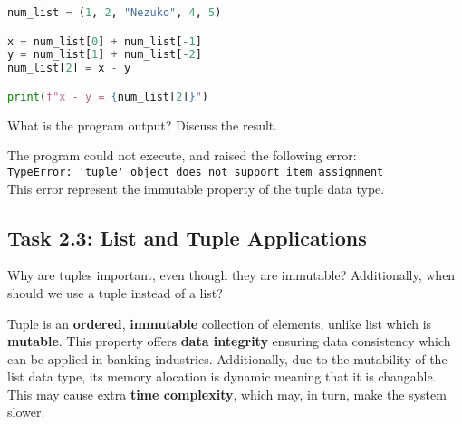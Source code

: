 \documentclass[11pt]{article}
\begin{document}
\begin{lstlisting}[language=Python]
num_list = (1, 2, "Nezuko", 4, 5)

x = num_list[0] + num_list[-1]
y = num_list[1] + num_list[-2]
num_list[2] = x - y

print(f"x - y = {num_list[2]}")
\end{lstlisting}

\noindent
What is the program output? Discuss the result.
\begin{tcolorbox}[colback=black!10!white, colframe=black!75!white, title=\textbf{Answer}]
    The program could not execute, and raised the following error:\\
    \verb|TypeError: 'tuple' object does not support item assignment|\\
    This error represent the immutable property of the tuple data type.
\end{tcolorbox} 

\subsection*{Task 2.3: List and Tuple Applications}
Why are tuples important, even though they are immutable? Additionally, when should we use a tuple instead of a list?
\begin{tcolorbox}[colback=black!10!white, colframe=black!75!white, title=\textbf{Answer}]
    Tuple is an \textbf{ordered}, \textbf{immutable} collection of elements, unlike list which is \textbf{mutable}.  
    This property offers \textbf{data integrity} ensuring data consistency which can be applied in banking industries.
    Additionally, due to the mutability of the list data type, its memory alocation is dynamic meaning that it is changable. This may cause extra \textbf{time complexity}, which may, in turn, make the system slower.
\end{tcolorbox} 
\end{document}
